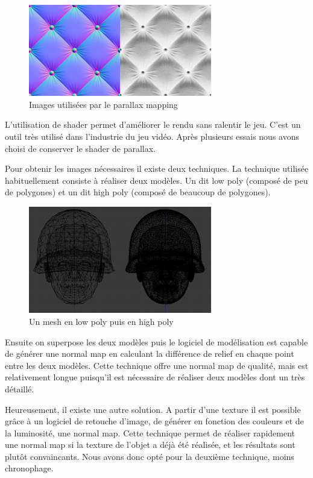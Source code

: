 \documentclass[11pt]{report}
\begin{document}
\begin{figure}[htbp]
\centering
\includegraphics[width=8cm]{parallax.png}
\caption{Images utilisées par le parallax mapping}
\end{figure}

L’utilisation de shader permet d’améliorer le rendu sans ralentir le jeu. C’est un outil très utilisé dans l’industrie du jeu vidéo. Après plusieurs essais nous avons choisi de conserver le shader de parallax.

Pour obtenir les images nécessaires il existe deux techniques. La technique utilisée habituellement consiste à réaliser deux modèles. Un dit low poly (composé de peu de polygones) et un dit high poly (composé de beaucoup de polygones).

\begin{figure}[htbp]
\centering
\includegraphics[width=8cm]{lowpoly_vs_highpoly.png}
\caption{Un mesh en low poly puis en high poly}
\end{figure}

Ensuite on superpose les deux modèles puis le logiciel de modélisation est capable de générer une normal map en calculant la différence de relief en chaque point entre les deux modèles.
Cette technique offre une normal map de qualité, mais est relativement longue puisqu'il est nécessaire de réaliser deux modèles dont un très détaillé.

Heureusement, il existe une autre solution. A partir d'une texture il est possible grâce à un logiciel de retouche d'image, de générer en fonction des couleurs et de la luminosité, une normal map.
Cette technique permet de réaliser rapidement une normal map si la texture de l'objet a déjà été réalisée, et les résultats sont plutôt convaincants. Nous avons donc opté pour la deuxième technique, moins chronophage.
\end{document}
